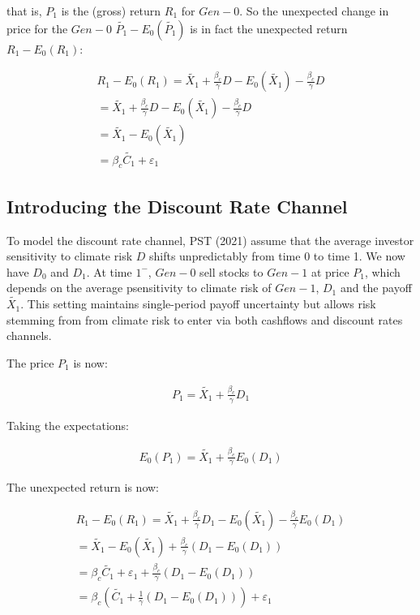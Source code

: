 that is, $P_1$ is the (gross) return
$R_1$ for $Gen-0$.
So the unexpected change in price 
for the $Gen-0$ $\tilde{P_1} - E_0(\tilde{P_1})$ is in fact
the unexpected return $R_1 - E_0(R_1)$:

\begin{equation}
    \begin{aligned}
    R_1 - E_0(R_1) = \tilde{X_1} + \frac{\beta_{c}}{\gamma}D - E_0(\tilde{X_1}) - \frac{\beta_{c}}{\gamma}D \\
    = \tilde{X_1} + \frac{\beta_{c}}{\gamma}D - E_0(\tilde{X_1}) - \frac{\beta_{c}}{\gamma}D \\
    = \tilde{X_1} - E_0(\tilde{X_1}) \\
    = \beta_{c} \tilde{C_1} + \varepsilon_1
    \end{aligned}
\end{equation}

\subsection{Introducing the Discount Rate Channel}

To model the discount rate channel, PST (2021)
assume that the average investor sensitivity to climate risk 
$D$ shifts unpredictably from time 0 
to time 1. We now have $D_0$ and $D_1$.
At time $1^{-}$, $Gen-0$ sell stocks 
to $Gen-1$ at price $P_1$, which depends 
on the average psensitivity to climate risk
of $Gen-1$, $D_1$ and the payoff $\tilde{X_1}$.
This setting maintains single-period 
payoff uncertainty but allows risk
stemming from from climate risk to enter 
via both cashflows and discount rates 
channels.

The price $P_1$ is now:

\begin{equation}
    \begin{aligned}
    P_1 = \tilde{X_1} + \frac{\beta_{c}}{\gamma}D_1
    \end{aligned}
\end{equation}

Taking the expectations:

\begin{equation}
    \begin{aligned}
    E_0(P_1) = \tilde{X_1} + \frac{\beta_{c}}{\gamma}E_0(D_1) 
    \end{aligned}
\end{equation}

The unexpected return is now:

\begin{equation}
    \begin{aligned}
    R_1 - E_0(R_1) = \tilde{X_1} + \frac{\beta_{c}}{\gamma}D_1 - E_0(\tilde{X_1}) - \frac{\beta_{c}}{\gamma}E_0(D_1) \\
    = \tilde{X_1} - E_0(\tilde{X_1}) + \frac{\beta_{c}}{\gamma}(D_1 - E_0(D_1)) \\
    = \beta_{c} \tilde{C_1} + \varepsilon_1 + \frac{\beta_{c}}{\gamma}(D_1 - E_0(D_1)) \\
    = \beta_{c}(\tilde{C_1} + \frac{1}{\gamma}(D_1 - E_0(D_1))) + \varepsilon_1
    \end{aligned}
\end{equation}

